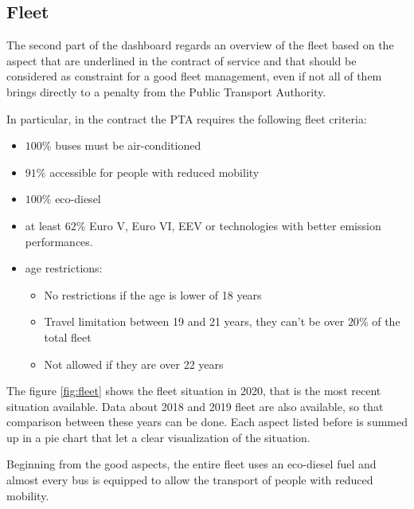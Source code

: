 \newpage
\begin{landscape}
\thispagestyle{empty}

\end{landscape}
\newpage

\subsection{Fleet}

The second part of the dashboard regards an overview of the fleet based on the aspect that are underlined in the contract of service and that should be considered as constraint for a good fleet management, even if not all of them brings directly to a penalty from the Public Transport Authority. 

In particular, in the contract the PTA requires the following fleet criteria:
\begin{itemize}
\item $100\%$ buses must be air-conditioned
\item $91\%$ accessible for people with reduced mobility
\item  $100\%$ eco-diesel
\item at least $62\%$ Euro V, Euro VI, EEV or technologies with better emission performances.
\item  age restrictions:
    \begin{itemize}
        \item No restrictions if the age is lower of 18 years
        \item Travel limitation between 19 and 21 years, they can't be over $20\%$ of the total fleet
        \item Not allowed if they are over 22 years
    \end{itemize}
\end{itemize}
The figure \ref{fig:fleet}
shows the fleet situation in 2020, that is the most recent situation available. Data about 2018 and 2019 fleet are also available, so that comparison between these years can be done. Each aspect listed before is summed up in a pie chart that let a clear visualization of the situation.

Beginning from the good aspects, the entire fleet uses an eco-diesel fuel and almost every bus is equipped to allow the transport of people with reduced mobility. 

